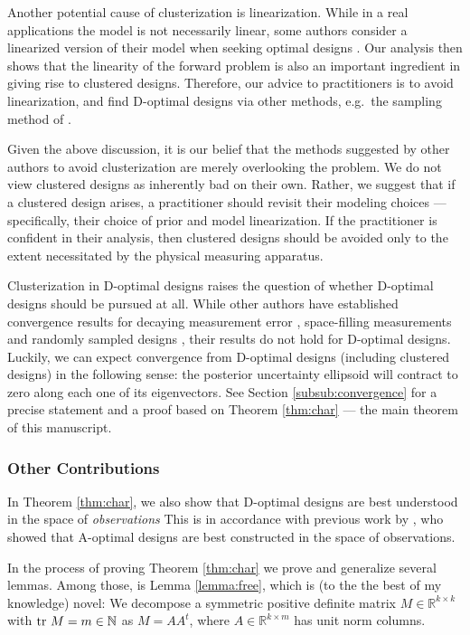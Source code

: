 \documentclass[ba]{imsart}
\newcommand{\ttr}[1]{\textup{tr}\ #1}
\theoremstyle{plain}
\theoremstyle{definition}
\theoremstyle{remark}
\begin{document}
Another potential cause of clusterization is linearization. While in a
real applications the model is not necessarily linear, some authors
consider a linearized version of their model when seeking optimal
designs \cite{fedorov1996, neitzel2019sparse}. Our analysis then shows
that the linearity of the forward problem is also an important
ingredient in giving rise to clustered designs. Therefore, our advice
to practitioners is to avoid linearization, and find D-optimal designs
via other methods, e.g.~the sampling method of \cite{ryan2003}.

Given the above discussion, it is our belief that the methods
suggested by other authors to avoid clusterization are merely
overlooking the problem. We do not view clustered designs as
inherently bad on their own. Rather, we suggest that if a clustered
design arises, a practitioner should revisit their modeling choices
--- specifically, their choice of prior and model linearization. If
the practitioner is confident in their analysis, then clustered
designs should be avoided only to the extent necessitated by the
physical measuring apparatus.

Clusterization in D-optimal designs raises the question of whether
D-optimal designs should be pursued at all. While other authors have
established convergence results for decaying measurement error
\cite{knapik2011}, space-filling measurements \cite{teckentrup2020}
and randomly sampled designs \cite{nickl2023}, their results do not
hold for D-optimal designs. Luckily, we can expect convergence from
D-optimal designs (including clustered designs) in the following
sense: the posterior uncertainty ellipsoid will contract to zero along
each one of its eigenvectors. See Section \ref{subsub:convergence} for
a precise statement and a proof based on Theorem \ref{thm:char} ---
the main theorem of this manuscript.


\subsubsection{Other Contributions}
In Theorem \ref{thm:char}, we also show that D-optimal designs are
best understood in the space of \emph{observations}
This is in accordance with previous work by \cite{koval2020}, who
showed that A-optimal designs are best constructed in the space of
observations.

In the process of proving Theorem \ref{thm:char} we prove and
generalize several lemmas. Among those, is Lemma \ref{lemma:free},
which is (to the the best of my knowledge) novel: We decompose a
symmetric positive definite matrix \(M \in \mathbb{R}^{k \times k}\)
with \(\ttr M = m \in \mathbb{N}\) as \(M = AA^t\), where \(A\in
\mathbb{R}^{k \times m}\) has unit norm columns.
\end{document}
